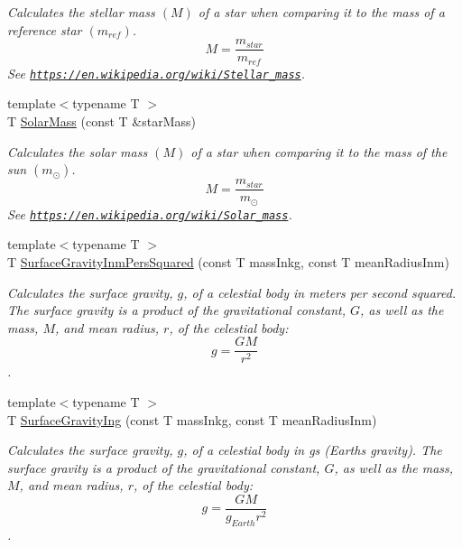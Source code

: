 \begin{DoxyCompactItemize}
\begin{DoxyCompactList}\small\item\em Calculates the stellar mass $(M)$ of a star when comparing it to the mass of a reference star $(m_{ref})$. \[M=\frac{m_{star}}{m_{ref}}\] See \href{https://en.wikipedia.org/wiki/Stellar_mass}{\tt https\+://en.\+wikipedia.\+org/wiki/\+Stellar\+\_\+mass}. \end{DoxyCompactList}\item 
{\footnotesize template$<$typename T $>$ }\\T \mbox{\hyperlink{group___e_g_x_phys-_stellar_mass_gac393d64d586be3dc76ac7a98ac336514}{Solar\+Mass}} (const T \&star\+Mass)
\begin{DoxyCompactList}\small\item\em Calculates the solar mass $(M)$ of a star when comparing it to the mass of the sun $(m_\odot)$. \[M=\frac{m_{star}}{m_\odot}\] See \href{https://en.wikipedia.org/wiki/Solar_mass}{\tt https\+://en.\+wikipedia.\+org/wiki/\+Solar\+\_\+mass}. \end{DoxyCompactList}\item 
{\footnotesize template$<$typename T $>$ }\\T \mbox{\hyperlink{group___e_g_x_phys-_astrophysics-_surface_gravity_gaf7e1f42b674fe8bb2211c40882a7d5b6}{Surface\+Gravity\+Inm\+Pers\+Squared}} (const T mass\+Inkg, const T mean\+Radius\+Inm)
\begin{DoxyCompactList}\small\item\em Calculates the surface gravity, $g$, of a celestial body in meters per second squared. The surface gravity is a product of the gravitational constant, $G$, as well as the mass, $M$, and mean radius, $r$, of the celestial body\+: \[g = \frac{GM}{r^2}\]. \end{DoxyCompactList}\item 
{\footnotesize template$<$typename T $>$ }\\T \mbox{\hyperlink{group___e_g_x_phys-_astrophysics-_surface_gravity_gab5bb479758d72608ef6ada063f6c1a1b}{Surface\+Gravity\+Ing}} (const T mass\+Inkg, const T mean\+Radius\+Inm)
\begin{DoxyCompactList}\small\item\em Calculates the surface gravity, $g$, of a celestial body in gs (Earth\textquotesingle{}s gravity). The surface gravity is a product of the gravitational constant, $G$, as well as the mass, $M$, and mean radius, $r$, of the celestial body\+: \[g = \frac{GM}{g_{Earth}r^2}\]. \end{DoxyCompactList}\item 

\end{DoxyCompactItemize}
